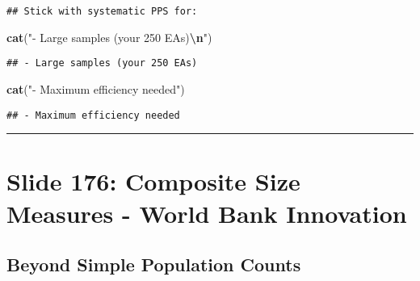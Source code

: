 \documentclass[
]{article}
\newenvironment{Shaded}{\begin{snugshade}}{\end{snugshade}}
\newcommand{\FunctionTok}[1]{\textcolor[rgb]{0.13,0.29,0.53}{\textbf{#1}}}
\newcommand{\NormalTok}[1]{#1}
\newcommand{\SpecialCharTok}[1]{\textcolor[rgb]{0.81,0.36,0.00}{\textbf{#1}}}
\newcommand{\StringTok}[1]{\textcolor[rgb]{0.31,0.60,0.02}{#1}}
\begin{document}
\begin{verbatim}
## Stick with systematic PPS for:
\end{verbatim}

\begin{Shaded}
\begin{Highlighting}[]
\FunctionTok{cat}\NormalTok{(}\StringTok{"{-} Large samples (your 250 EAs)}\SpecialCharTok{\textbackslash{}n}\StringTok{"}\NormalTok{)}
\end{Highlighting}
\end{Shaded}

\begin{verbatim}
## - Large samples (your 250 EAs)
\end{verbatim}

\begin{Shaded}
\begin{Highlighting}[]
\FunctionTok{cat}\NormalTok{(}\StringTok{"{-} Maximum efficiency needed"}\NormalTok{)}
\end{Highlighting}
\end{Shaded}

\begin{verbatim}
## - Maximum efficiency needed
\end{verbatim}

\begin{center}\rule{0.5\linewidth}{0.5pt}\end{center}

\section{Slide 176: Composite Size Measures - World Bank
Innovation}\label{slide-176-composite-size-measures---world-bank-innovation}

\subsection{Beyond Simple Population
Counts}\label{beyond-simple-population-counts}
\end{document}
